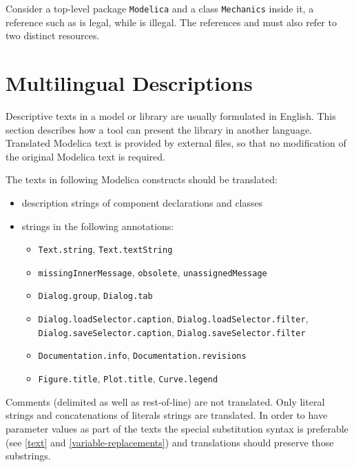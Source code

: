 \begin{example}
Consider a top-level package \lstinline!Modelica! and a class
\lstinline!Mechanics! inside it, a reference such as
 is legal, while
 is illegal.
The references  and  must also refer to two distinct resources.
\end{example}

\section{Multilingual Descriptions}\label{multilingual-descriptions}

\begin{nonnormative}
Descriptive texts in a model or library are usually formulated in English.
This section describes how a tool can present the library in another language.
Translated Modelica text is provided by external files, so that no modification of the original Modelica text is required.
\end{nonnormative}

The texts in following Modelica constructs should be translated:
\begin{itemize}
\item description strings of component declarations and classes
\item strings in the following annotations:
\begin{itemize}
\item \lstinline!Text.string!, \lstinline!Text.textString!
\item \lstinline!missingInnerMessage!, \lstinline!obsolete!, \lstinline!unassignedMessage!
\item \lstinline!Dialog.group!, \lstinline!Dialog.tab!
\item \lstinline!Dialog.loadSelector.caption!, \lstinline!Dialog.loadSelector.filter!, \lstinline!Dialog.saveSelector.caption!, \lstinline!Dialog.saveSelector.filter!
\item \lstinline!Documentation.info!, \lstinline!Documentation.revisions!
\item \lstinline!Figure.title!, \lstinline!Plot.title!, \lstinline!Curve.legend!
\end{itemize}
\end{itemize}

Comments (delimited as well as rest-of-line) are not translated.
Only literal strings and concatenations of literals strings are translated.
In order to have parameter values as part of the texts the special substitution syntax is preferable (see \cref{text} and \cref{variable-replacements}) and translations should preserve those substrings.

